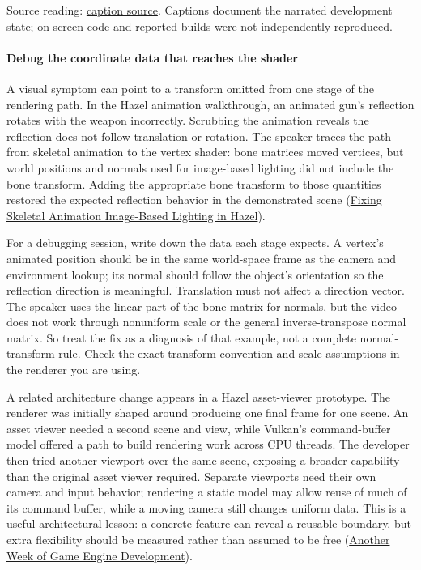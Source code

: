 Source reading: \href{https://www.youtube.com/watch?v=uD_vLeHvM1M}{caption source}. Captions document the narrated development state; on-screen code and reported builds were not independently reproduced.

\paragraph{Debug the coordinate data that reaches the shader}\label{06-engine-ii-ch026-debug-the-coordinate-data-that-reaches-the-shader}

A visual symptom can point to a transform omitted from one stage of the rendering path. In the Hazel animation walkthrough, an animated gun's reflection rotates with the weapon incorrectly. Scrubbing the animation reveals the reflection does not follow translation or rotation. The speaker traces the path from skeletal animation to the vertex shader: bone matrices moved vertices, but world positions and normals used for image-based lighting did not include the bone transform. Adding the appropriate bone transform to those quantities restored the expected reflection behavior in the demonstrated scene (\href{https://www.youtube.com/watch?v=fs9ChRr4VHM&t=4m18s}{Fixing Skeletal Animation Image-Based Lighting in Hazel}).

For a debugging session, write down the data each stage expects. A vertex's animated position should be in the same world-space frame as the camera and environment lookup; its normal should follow the object's orientation so the reflection direction is meaningful. Translation must not affect a direction vector. The speaker uses the linear part of the bone matrix for normals, but the video does not work through nonuniform scale or the general inverse-transpose normal matrix. So treat the fix as a diagnosis of that example, not a complete normal-transform rule. Check the exact transform convention and scale assumptions in the renderer you are using.

A related architecture change appears in a Hazel asset-viewer prototype. The renderer was initially shaped around producing one final frame for one scene. An asset viewer needed a second scene and view, while Vulkan's command-buffer model offered a path to build rendering work across CPU threads. The developer then tried another viewport over the same scene, exposing a broader capability than the original asset viewer required. Separate viewports need their own camera and input behavior; rendering a static model may allow reuse of much of its command buffer, while a moving camera still changes uniform data. This is a useful architectural lesson: a concrete feature can reveal a reusable boundary, but extra flexibility should be measured rather than assumed to be free (\href{https://www.youtube.com/watch?v=Dr6ly-PO9nM&t=2m12s}{Another Week of Game Engine Development}).

